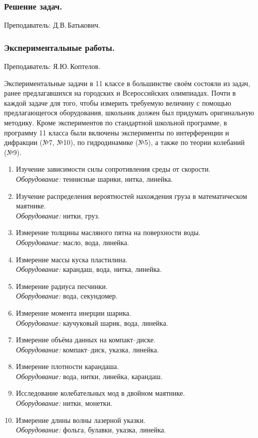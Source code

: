 \documentclass[12pt,a4paper,oneside,draft]{scrartcl}
\begin{document}
\subsubsection{Решение задач.}
\label{sec:daily_11_problems}

\textsf{Преподаватель: Д.В.\,Батькович.}
\smallskip

\subsubsection{Экспериментальные работы.}
\label{sec:daily_11_exp}

\textsf{Преподаватель: Я.Ю.\,Коптелов.}
\smallskip

Экспериментальные задачи в 11 классе в большинстве своём состояли из
задач, ранее предлагавшихся на городских и Всероссийских
олимпиадах. Почти в каждой задаче для того, чтобы измерить требуемую
величину с помощью предлагающегося оборудования, школьник должен был
придумать оригинальную методику. Кроме экспериментов по стандартной
школьной программе, в программу 11 класса были включены эксперименты
по интерференции и дифракции (№7, №10), по гидродинамике (№5), а также
по теории колебаний (№9).

\begin{enumerate}
\item Изучение зависимости силы сопротивления среды от скорости. \\
  \textit{Оборудование:} теннисные шарики, нитка, линейка.
\item Изучение распределения вероятностей нахождения груза в
  математическом маятнике. \\ \textit{Оборудование:} нитки, груз.
\item Измерение толщины масляного пятна на поверхности воды. \\
  \textit{Оборудование:} масло, вода, линейка.
\item Измерение массы куска пластилина. \\ \textit{Оборудование:}
  карандаш, вода, нитка, линейка.
\item Измерение радиуса песчинки. \\ \textit{Оборудование:} вода, секундомер.
\item Измерение момента инерции шарика. \\ \textit{Оборудование:}
  каучуковый шарик, вода, линейка.
\item Измерение объёма данных на компакт--диске. \\
  \textit{Оборудование:} компакт--диск, указка, линейка.
\item Измерение плотности карандаша. \\ \textit{Оборудование:} вода,
  нитки, линейка, карандаш.
\item Исследование колебательных мод в двойном маятнике. \\
  \textit{Оборудование:} нитки, монетки.
\item Измерение длины волны лазерной указки. \\ \textit{Оборудование:}
  фольга, булавки, указка, линейка.
\end{enumerate}
\end{document}
